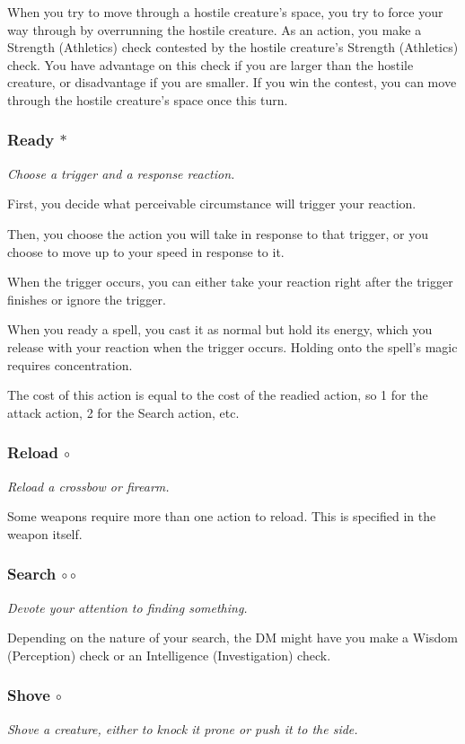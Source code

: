     When you try to move through a hostile creature's space, you try to force your way through by overrunning the hostile creature.
    As an action, you make a Strength (Athletics) check contested by the hostile creature's Strength (Athletics) check.
    You have advantage on this check if you are larger than the hostile creature, or disadvantage if you are smaller.
    If you win the contest, you can move through the hostile creature's space once this turn.
\subsubsection{Ready $\ast$} \label{act::ready}
    \textit{Choose a trigger and a response reaction.}

    First, you decide what perceivable circumstance will trigger your reaction.

    Then, you choose the action you will take in response to that trigger, or you choose to move up to your speed in response to it.

    When the trigger occurs, you can either take your reaction right after the trigger finishes or ignore the trigger.

    When you ready a spell, you cast it as normal but hold its energy, which you release with your reaction when the trigger occurs.
    Holding onto the spell's magic requires concentration.

    The cost of this action is equal to the cost of the readied action, so 1 for the attack action, 2 for the Search action, etc.
\subsubsection{Reload $\circ$} \label{act::reload}
    \textit{Reload a crossbow or firearm.}

    Some weapons require more than one action to reload.
    This is specified in the weapon itself.
\subsubsection{Search $\circ\circ$} \label{act::search}
    \textit{Devote your attention to finding something.}

    Depending on the nature of your search, the DM might have you make a Wisdom (Perception) check or an Intelligence (Investigation) check.
\subsubsection{Shove $\circ$} \label{act::shove}
    \textit{Shove a creature, either to knock it prone or push it to the side.}

